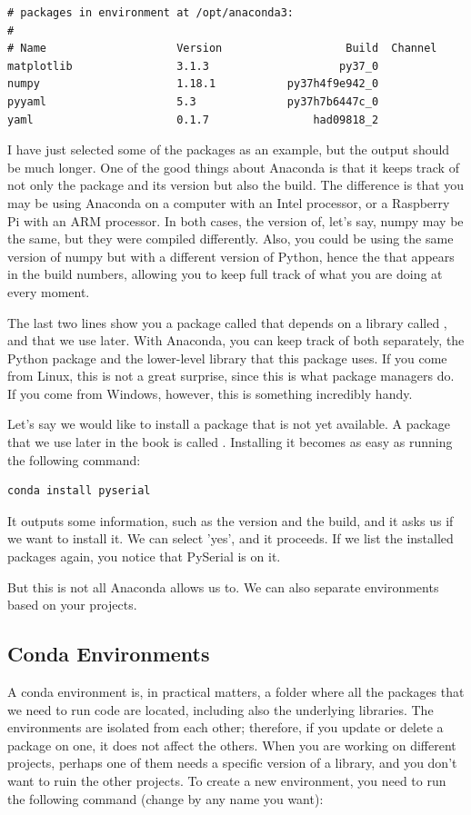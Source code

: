 \begin{verbatim}
# packages in environment at /opt/anaconda3:
#
# Name                    Version                   Build  Channel
matplotlib                3.1.3                    py37_0
numpy                     1.18.1           py37h4f9e942_0
pyyaml                    5.3              py37h7b6447c_0
yaml                      0.1.7                had09818_2
\end{verbatim}

I have just selected some of the packages as an example, but the output should be much longer. One of the good things about Anaconda is that it keeps track of not only the package and its version but also the build. The difference is that you may be using Anaconda on a computer with an Intel processor, or a Raspberry Pi with an ARM processor. In both cases, the version of, let's say, numpy may be the same, but they were compiled differently. Also, you could be using the same version of numpy but with a different version of Python, hence the  that appears in the build numbers, allowing you to keep full track of what you are doing at every moment.

The last two lines show you a package called  that depends on a library called , and that we use later. With Anaconda, you can keep track of both separately, the Python package and the lower-level library that this package uses. If you come from Linux, this is not a great surprise, since this is what package managers do. If you come from Windows, however, this is something incredibly handy.

Let's say we would like to install a package that is not yet available. A package that we use later in the book is called . Installing it becomes as easy as running the following command:

\begin{verbatim}
conda install pyserial
\end{verbatim}

It outputs some information, such as the version and the build, and it asks us if we want to install it. We can select 'yes', and it proceeds. If we list the installed packages again, you notice that PySerial is on it.

But this is not all Anaconda allows us to. We can also separate environments based on your projects.

\subsection{Conda Environments}\label{subsec:conda-environments}
A conda environment is, in practical matters, a folder where all the packages that we need to run code are located, including also the underlying libraries. The environments are isolated from each other; therefore, if you update or delete a package on one, it does not affect the others. When you are working on different projects, perhaps one of them needs a specific version of a library, and you don't want to ruin the other projects. To create a new environment, you need to run the following command (change  by any name you want):


